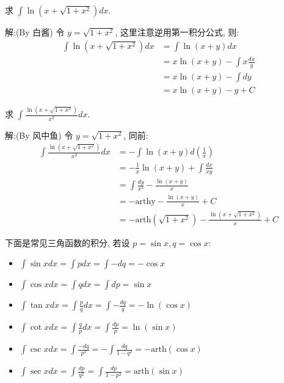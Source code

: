 \documentclass[lang=cn,newtx,10pt,scheme=chinese]{elegantbook}
\begin{document}
\begin{example} 求 $\int \ln(x + \sqrt{1 + x^2}) dx$.
\end{example}
\begin{solution}
  解:(By 白酱) 令 $y = \sqrt{1 + x^2}$, 这里注意逆用第一积分公式, 则:
  $$
  \begin{aligned}
  \int \ln(x + \sqrt{1 + x^2}) dx &= \int \ln(x + y) dx \\
  &= x \ln(x + y) - \int x \frac{dx}{y} \\
  &= x \ln(x + y) - \int dy \\
  &= x \ln(x + y) - y + C
  \end{aligned}
  $$
\end{solution}

\begin{example}[\textcolor{green}{2.7}]
  求 $\int \frac{\ln(x + \sqrt{1 + x^2})}{x^2} dx$.
\end{example}
\begin{solution}
  解:(By 风中鱼) 令 $y = \sqrt{1 + x^2}$, 同前:
  $$
  \begin{aligned}
  \int \frac{\ln(x + \sqrt{1 + x^2})}{x^2} dx &= -\int \ln(x + y) d\left(\frac{1}{x}\right) \\
  &= -\frac{1}{x} \ln(x + y) + \int \frac{dx}{xy} \\
  &= \int \frac{dy}{x^2} - \frac{\ln(x + y)}{x} \\
  &= -\text{arthy} - \frac{\ln(x + y)}{x} + C \\
  &= -\text{arth}(\sqrt{1 + x^2}) - \frac{\ln(x + \sqrt{1 + x^2})}{x} + C
  \end{aligned}
  $$
\end{solution}

下面是常见三角函数的积分, 若设 $p = \sin x, q = \cos x$:
\begin{itemize}
  \item $\int \sin x dx = \int p dx = \int -dq = -\cos x$
  \item $\int \cos x dx = \int q dx = \int dp = \sin x$
  \item $\int \tan x dx = \int \frac{p}{q} dx = \int -\frac{dq}{q} = -\ln(\cos x)$
  \item $\int \cot x dx = \int \frac{q}{p} dx = \int \frac{dp}{p} = \ln(\sin x)$
  \item $\int \csc x dx = \int \frac{-dq}{p^2} = -\int \frac{dq}{1 - q^2} = -\text{arth}(\cos x)$
  \item $\int \sec x dx = \int \frac{dp}{q^2} = \int \frac{dp}{1 - p^2} = \text{arth}(\sin x)$
\end{itemize}
\end{document}
